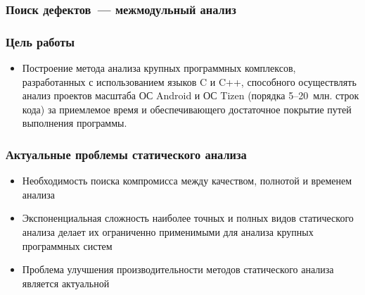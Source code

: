 \documentclass[hyperref={pdfpagelabels=false}]{beamer}
\begin{document}
\begin{frame}
\frametitle{Поиск дефектов~--- межмодульный анализ}
\begin{figure}[h]
\end{figure}
\end{frame}


\begin{frame}
\frametitle{Цель работы}
\begin{itemize}
  \item Построение метода анализа крупных программных комплексов, разработанных с использованием языков C и C++, способного осуществлять анализ проектов масштаба ОС Android и ОС Tizen (порядка 5--20~млн. строк кода) за приемлемое время и обеспечивающего достаточное покрытие путей выполнения программы.
\end{itemize}
\end{frame}

\begin{frame}
\frametitle{Актуальные проблемы статического анализа}
\begin{itemize}
  \item Необходимость поиска компромисса между качеством, полнотой и временем анализа
  \item Экспоненциальная сложность наиболее точных и полных видов статического анализа делает их ограниченно применимыми для анализа крупных программных систем
  \item Проблема улучшения производительности методов статического анализа является актуальной   
\end{itemize}
\end{frame}
\end{document}
